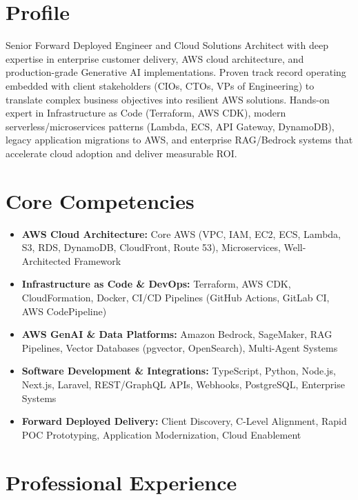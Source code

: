 \documentclass[11pt,a4paper,sans]{moderncv}
\begin{document}
\makecvtitle
\vspace{-18pt}

\section{Profile}
Senior Forward Deployed Engineer and Cloud Solutions Architect with deep expertise in enterprise customer delivery, AWS cloud architecture, and production-grade Generative AI implementations. Proven track record operating embedded with client stakeholders (CIOs, CTOs, VPs of Engineering) to translate complex business objectives into resilient AWS solutions. Hands-on expert in Infrastructure as Code (Terraform, AWS CDK), modern serverless/microservices patterns (Lambda, ECS, API Gateway, DynamoDB), legacy application migrations to AWS, and enterprise RAG/Bedrock systems that accelerate cloud adoption and deliver measurable ROI.

\section{Core Competencies}
\begin{itemize}
\item \textbf{AWS Cloud Architecture:} Core AWS (VPC, IAM, EC2, ECS, Lambda, S3, RDS, DynamoDB, CloudFront, Route 53), Microservices, Well-Architected Framework
\item \textbf{Infrastructure as Code \& DevOps:} Terraform, AWS CDK, CloudFormation, Docker, CI/CD Pipelines (GitHub Actions, GitLab CI, AWS CodePipeline)
\item \textbf{AWS GenAI \& Data Platforms:} Amazon Bedrock, SageMaker, RAG Pipelines, Vector Databases (pgvector, OpenSearch), Multi-Agent Systems
\item \textbf{Software Development \& Integrations:} TypeScript, Python, Node.js, Next.js, Laravel, REST/GraphQL APIs, Webhooks, PostgreSQL, Enterprise Systems
\item \textbf{Forward Deployed Delivery:} Client Discovery, C-Level Alignment, Rapid POC Prototyping, Application Modernization, Cloud Enablement
\end{itemize}

\section{Professional Experience}
\end{document}
